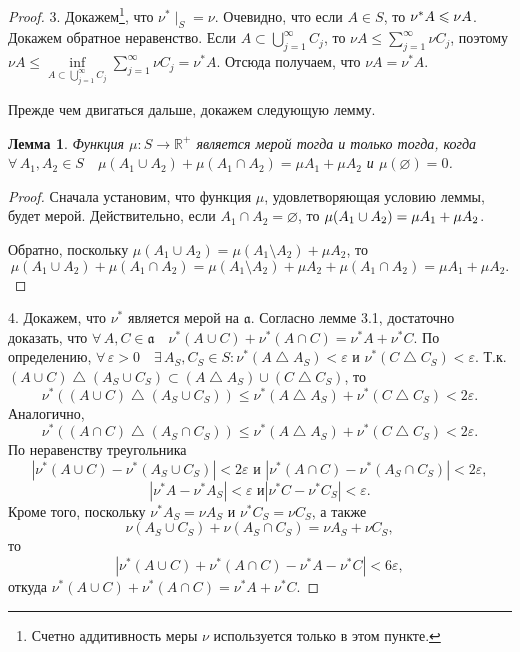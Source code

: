 \documentclass[12pt,titlepage]{article}
\newcounter{tema}
\newtheorem{lemm}{Лемма}[tema]
\theoremstyle{definition}
\newcommand*{\p}[1]{#1\nobreak\discretionary{}{\hbox{$\mathsurround=0pt #1$}}{}}
\begin{document}
\begin{proof}
3. Докажем\footnote{Счетно аддитивность меры $\nu$ используется
только в этом пункте.}, что $\nu^*\mid_S=\nu$. Очевидно, что если
$A\in S$, то $\nu^*A\p\leqslant\nu A$. Докажем обратное неравенство.
Если $A\subset\bigcup\limits_{j=1}^\infty C_j$, то $\nu
A\leqslant\sum\limits_{j=1}^\infty\nu C_j$, поэтому $\nu
A\leqslant\inf\limits_{A\subset\bigcup\limits_{j=1}^\infty
C_j}\sum\limits_{j=1}^\infty\nu C_j=\nu^*A$. Отсюда получаем, что
$\nu A=\nu^*A$.

Прежде чем двигаться дальше, докажем следующую лемму.

\begin{lemm}
Функция $\mu\colon S\to\mathbb{R}^+$ является мерой тогда и только
тогда, когда $\forall\,A_1,A_2\in S\quad \mu(A_1\cup
A_2)+\mu(A_1\cap A_2)=\mu A_1+\mu A_2$ и $\mu(\varnothing)=0$.
\end{lemm}

\begin{proof}
Сначала установим, что функция $\mu$, удовлетворяющая условию леммы,
будет мерой. Действительно, если $A_1\cap A_2=\varnothing$, то
$\mu(A_1\p\cup A_2)=\mu A_1+\mu A_2$.

Обратно, поскольку $\mu(A_1\cup A_2)=\mu(A_1\setminus A_2)+\mu A_2$,
то $$\mu(A_1\cup A_2)+\mu(A_1\cap A_2)=\mu(A_1\setminus A_2)+\mu
A_2+\mu(A_1\cap A_2)=\mu A_1+\mu A_2.$$
\end{proof}

4. Докажем, что $\nu^*$ является мерой на $\mathfrak{a}$. Согласно
лемме 3.1, достаточно доказать, что
$\forall\,A,C\in\mathfrak{a}\quad \nu^*(A\cup C)+\nu^*(A\cap
C)=\nu^* A+\nu^* C$. По определению, $\forall\,
\varepsilon>0\quad\exists\,A_S,C_S\in S: \nu^*(A\bigtriangleup
A_S)<\varepsilon$ и $\nu^*(C\bigtriangleup C_S)<\varepsilon$. Т.к.
$(A\cup C)\bigtriangleup(A_S\cup C_S)\subset (A\bigtriangleup
A_S)\cup(C\bigtriangleup C_S)$, то $$\nu^*((A\cup
C)\bigtriangleup(A_S\cup C_S))\leqslant\nu^*(A\bigtriangleup
A_S)+\nu^*(C\bigtriangleup C_S)<2\varepsilon.$$ Аналогично,
$$\nu^*((A\cap C)\bigtriangleup(A_S\cap
C_S))\leqslant\nu^*(A\bigtriangleup A_S)+\nu^*(C\bigtriangleup
C_S)<2\varepsilon.$$ По неравенству треугольника
$$\text{$|\nu^*(A\cup C)-\nu^*(A_S\cup C_S)|<2\varepsilon$ и $|\nu^*
(A\cap C)-\nu^*(A_S\cap C_S)|<2\varepsilon$},$$
$$\text{$|\nu^*A-\nu^*A_S|<\varepsilon$ и
$|\nu^*C-\nu^*C_S|<\varepsilon$}.$$ Кроме того, поскольку
$\nu^*A_S=\nu A_S$ и $\nu^*C_S=\nu C_S$, а также $$\nu(A_S\cup
C_S)+\nu(A_S\cap C_S)=\nu A_S+\nu C_S,$$ то $$|\nu^*(A\cup
C)+\nu^*(A\cap C)-\nu^*A-\nu^*C|<6\varepsilon,$$ откуда $\nu^*(A\cup
C)+\nu^*(A\cap C)=\nu^*A+\nu^*C$.


\end{proof}
\end{document}

